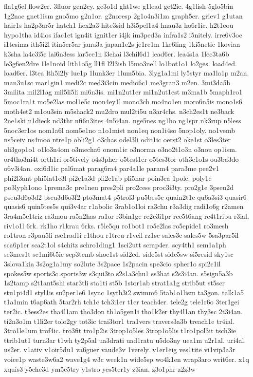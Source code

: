 {fla1g6el
flow2er.
3fluor
gen2cy.
ge3o1d
ght1we
g1lead
get2ic.
4g1lish
5glo5bin
1g2nac
gnet1ism
gno5mo
g2n1or.
g2noresp
2g1o4n3i1za
graph5er.
griev1
g1utan
hair1s
ha2p3ar5r
hatch1
hex2a3
hite3sid
h3i5pel1a4
hnau3z
ho6r1ic.
h2t1eou
hypo1tha
id4ios
ifac1et
ign4it
ignit1er
i4jk
im3ped3a
infra1s2
i5nitely.
irre6v3oc
i1tesima
ith5i2l
itin5er5ar
janu3a
japan1e2s
je1re1m
1ke6ling
1ki5netic
1kovian
k3sha
la4c3i5e
lai6n3ess
lar5ce1n
l3chai
l3chil6d1
lead6er.
lea4s1a
1lec3ta6b
le3g6en2dre
1le1noid
lith1o5g
ll1fl
l2l3ish
l5mo3nell
lo1bot1o1
lo2ges.
load4ed.
load6er.
l3tea
lth5i2ly
lue1p
1lunk3er
1lum5bia.
3lyg1a1mi
ly5styr
ma1la1p
m2an.
man3u1sc
mar1gin1
medi2c
med3i3cin
medio6c1
me3gran3
m2en.
3mi3da5b
3milita
mil2l1ag
mil5li5li
mi6n3is.
mi1n2ut1er
mi1n2ut1est
m3ma1b
5maph1ro1
5moc1ra1t
mo5e2las
mol1e5c
mon4ey1l
mono3ch
mo4no1en
moro6n5is
mono1s6
moth4et2
m1ou3sin
m5shack2
mu2dro
mul2ti5u
n3ar4chs.
n3ch2es1t
ne3back
2ne1ski
n1dieck
nd3thr
nfi6n3ites
4n5i4an.
nge5nes
ng1ho
ng1spr
nk3rup
n5less
5noc3er1os
nom1a6l
nom5e1no
n1o1mist
non1eq
non1i4so
5nop1oly.
no1vemb
ns5ceiv
ns4moo
ntre1p
obli2g1
o3chas
odel3li
odit1ic
oerst2
oke1st
o3les3ter
oli3gop1o1
o1lo3n4om
o3mecha6
onom1ic
o3norma
o3no2t1o3n
o3nou
op1ism.
or4tho3ni4t
orth1ri
or5tively
o4s3pher
o5test1er
o5tes3tor
oth3e1o1s
ou3ba3do
o6v3i4an.
oxi6d1ic
pal6mat
parag6ra4
par4a1le
param4
para3me
pee2v1
phi2l3ant
phi5lat1e3l
pi2c1a3d
pli2c1ab
pli5nar
poin3ca
1pole.
poly1e
po3lyph1ono
1prema3c
pre1neu
pres2pli
pro2cess
proc3i3ty.
pro2g1e
3pseu2d
pseu3d6o3d2
pseu3d6o3f2
pto3mat4
p5trol3
pu5bes5c
quain2t1e
qu6a3si3
quasir6
quasis6
quin5tes5s
qui3v4ar
r1abolic
3rab1o1loi
ra3chu
r3a3dig
radi1o6g
r2amen
3ra4m5e1triz
ra3mou
ra5n2has
ra1or
r3bin1ge
re2c3i1pr
rec5t6ang
re4t1ribu
r3ial.
riv1o1l
6rk.
rk1ho
r1krau
6rks.
r5le5qu
ro1bot1
ro5e2las
ro5epide1
ro3mesh
ro1tron
r3pau5li
rse1rad1i
r1thou
r1treu
r1veil
rz1sc
sales3c
sales5w
5sa3par5il
sca6p1er
sca2t1ol
s4chitz
schro1ding1
1sci2utt
scrap4er.
scy4th1
sem1a1ph
se3mes1t
se1mi6t5ic
sep3temb
shoe1st
sid2ed.
side5st
side5sw
si5resid
sky1sc
3slova1kia
3s2og1a1my
so2lute
3s2pace
1s2pacin
spe3cio
spher1o
spi2c1il
spokes5w
sports3c
sports3w
s3qui3to
s2s1a3chu1
ss3hat
s2s3i4an.
s5sign5a3b
1s2tamp
s2t1ant5shi
star3tli
sta1ti
st5b
1stor1ab
strat1a1g
strib5ut
st5scr
stu1pi4d1
styl1is
su2per1e6
1sync
1syth3i2
swimm6
5tab1o1lism
ta3gon.
talk1a5
t1a1min
t6ap6ath
5tar2rh
tch1c
tch3i1er
t1cr
teach4er.
tele2g
tele1r6o
3ter1gei
ter2ic.
t3ess2es
tha4l1am
tho3don
th1o5gen1i
tho1k2er
thy4l1an
thy3sc
2t3i4an.
ti2n3o1m
t1li2er
tolo2gy
tot3ic
trai3tor1
tra1vers
travers3a3b
treach1e
tr4ial.
3tro1le1um
trof4ic.
tro3fit
tro1p2is
3trop1o5les
3trop1o5lis
t1ro1pol3it
tsch3ie
ttrib1ut1
turn3ar
t1wh
ty2p5al
ua3drati
uad1ratu
u5do3ny
uea1m
u2r1al.
uri4al.
us2er.
v1ativ
v1oir5du1
va6guer
vaude3v
1verely.
v1er1eig
ves1tite
vi1vip3a3r
voice1p
waste3w6a2
wave1g4
w3c
week1n
wide5sp
wo4k1en
wrap3aro
writ6er.
x1q
xquis3
y5che3d
ym5e5try
y1stro
yes5ter1y
z3ian.
z3o1phr
z2z3w
}
